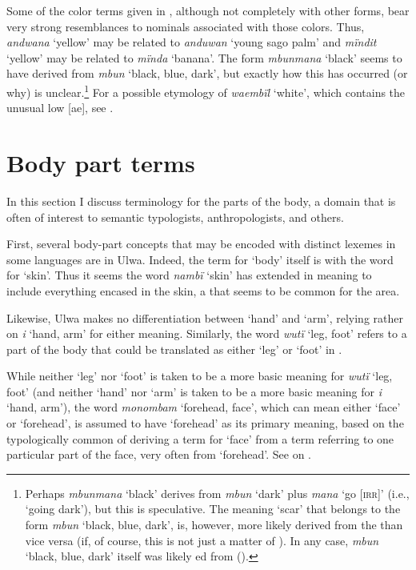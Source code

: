   Some of the color terms given in , although not completely  with other forms, bear very strong resemblances to nominals associated with those colors. Thus, \textit{andwana} ‘yellow’ may be related to \textit{anduwan} ‘young sago palm’ and \textit{mïndit} ‘yellow’ may be related to \textit{mïnda} ‘banana’. The form \textit{mbunmana} ‘black’ seems to have derived from \textit{mbun} ‘black, blue, dark’, but exactly how this has occurred (or why) is unclear.\footnote{Perhaps \textit{mbunmana} ‘black’ derives from \textit{mbun} ‘dark’ plus \textit{mana} ‘go [\textsc{irr]}’ (i.e., ‘going dark’), but this is speculative. The meaning ‘scar’ that belongs to the form \textit{mbun} ‘black, blue, dark’, is, however, more likely derived from the  than vice versa (if, of course, this is not just a matter of ). In any case, \textit{mbun} ‘black, blue, dark’ itself was likely ed from  ().} For a possible etymology of \textit{waembïl} ‘white’, which contains the unusual  low  [ae], see .\largerpage



\section{Body part terms}\label{sec:14.6}


In this section I discuss terminology for the parts of the body, a domain that is often of interest to semantic typologists, anthropologists, and others.

  First, several body-part concepts that may be encoded with distinct lexemes in some languages are  in Ulwa. Indeed, the term for ‘body’ itself is  with the word for ‘skin’. Thus it seems the word \textit{nambï} ‘skin’ has extended in meaning to include everything encased in the skin, a  that seems to be common for the area.

Likewise, Ulwa makes no  differentiation between ‘hand’ and ‘arm’, relying rather on \textit{i} ‘hand, arm’ for either meaning. Similarly, the word \textit{wutï} ‘leg, foot’ refers to a part of the body that could be translated as either ‘leg’ or ‘foot’ in .

  While neither ‘leg’ nor ‘foot’ is taken to be a more basic meaning for \textit{wutï} ‘leg, foot’ (and neither ‘hand’ nor ‘arm’ is taken to be a more basic meaning for \textit{i} ‘hand, arm’), the word \textit{monombam} ‘forehead, face’, which can mean either ‘face’ or ‘forehead’, is assumed to have ‘forehead’ as its primary meaning, based on the typologically common  of deriving a term for ‘face’ from a term referring to one particular part of the face, very often from ‘forehead’. See  on  .

